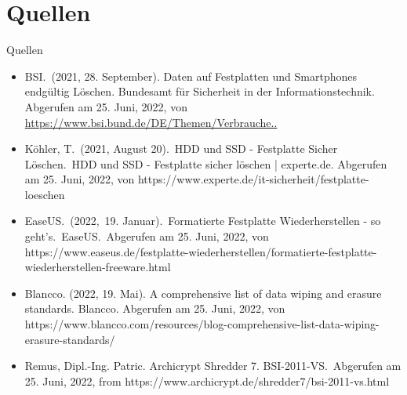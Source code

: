 \documentclass{beamer}
\begin{document}
\section{Quellen}
\begin{frame}{Quellen}
		\begin{itemize}
			\item \begin{scriptsize}
				BSI.\ (2021, 28. September). Daten auf Festplatten und Smartphones
				endgültig Löschen. Bundesamt für Sicherheit in der
				Informationstechnik. Abgerufen am 25. Juni, 2022, von
				\href{https://www.bsi.bund.de/DE/Themen/Verbraucherinnen-und-Verbraucher/Informationen-und-Empfehlungen/Cyber-Sicherheitsempfehlungen/Daten-sichern-verschluesseln-und-loeschen/Daten-endgueltig-loeschen/daten-endgueltig-loeschen_node.html}{https://www.bsi.bund.de/DE/Themen/Verbrauche..}
			\end{scriptsize}
			\item \begin{scriptsize}
				Köhler, T.\ (2021, August 20).\ HDD und SSD - Festplatte Sicher
				Löschen.\ HDD und SSD - Festplatte sicher löschen | experte.de.
				Abgerufen am 25. Juni, 2022, von
				https://www.experte.de/it-sicherheit/festplatte-loeschen
			\end{scriptsize}
			\item \begin{scriptsize}
				EaseUS.\ (2022,\ 19. Januar).\ Formatierte Festplatte
				Wiederherstellen - so geht's.\ EaseUS.\ Abgerufen am 25. Juni, 2022,
				von
				https://www.easeus.de/festplatte-wiederherstellen/formatierte-festplatte-wiederherstellen-freeware.html 
			\end{scriptsize}
			\item \begin{scriptsize}
				Blancco. (2022, 19. Mai). A comprehensive list of data wiping and
				erasure standards. Blancco. Abgerufen am 25. Juni, 2022, von
				https://www.blancco.com/resources/blog-comprehensive-list-data-wiping-erasure-standards/
			\end{scriptsize}
			\item \begin{scriptsize}
				Remus, Dipl.-Ing. Patric. Archicrypt Shredder 7. BSI-2011-VS.\
				Abgerufen am 25. Juni, 2022, from
				https://www.archicrypt.de/shredder7/bsi-2011-vs.html
			\end{scriptsize}
		\end{itemize}
\end{frame}
\end{document}

